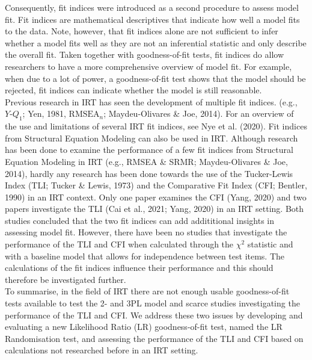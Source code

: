 \documentclass[Royal,sageapa,times,doublespace]{sagej}
\begin{document}
\indent Consequently, fit indices were introduced as a second procedure to assess model fit. Fit indices are mathematical descriptives that indicate how well a model fits to the data. Note, however, that fit indices alone are not sufficient to infer whether a model fits well as they are not an inferential statistic and only describe the overall fit. Taken together with goodness-of-fit tests, fit indices do allow researchers to have a more comprehensive overview of model fit. For example, when due to a lot of power, a goodness-of-fit test shows that the model should be rejected, fit indices can indicate whether the model is still reasonable. \\ 
\indent Previous research in IRT has seen the development of multiple fit indices. (e.g., $Y\text{-}Q_1$; Yen, 1981, $\text{RMSEA}_n$; Maydeu-Olivares \& Joe, 2014). For an overview of the use and limitations of several IRT fit indices, see Nye et al. (2020). Fit indices from Structural Equation Modeling can also be used in IRT. Although research has been done to examine the performance of a few fit indices from Structural Equation Modeling in IRT (e.g., RMSEA \& SRMR; Maydeu-Olivares \& Joe, 2014), hardly any research has been done towards the use of the Tucker-Lewis Index (TLI; Tucker \& Lewis, 1973) and the Comparative Fit Index (CFI; Bentler, 1990) in an IRT context. Only one paper examines the CFI (Yang, 2020) and two papers investigate the TLI (Cai et al., 2021; Yang, 2020) in an IRT setting. Both studies concluded that the two fit indices can add addititional insights in assessing model fit. However, there have been no studies that investigate the performance of the TLI and CFI when calculated through the $\chi^2$ statistic and with a baseline model that allows for independence between test items. The calculations of the fit indices influence their performance and this should therefore be investigated further. \\
\indent To summarise, in the field of IRT there are not enough usable goodness-of-fit tests available to test the 2- and 3PL model and scarce studies investigating the performance of the TLI and CFI. We address these two issues by developing and evaluating a new Likelihood Ratio (LR) goodness-of-fit test, named the LR Randomisation test, and assessing the performance of the TLI and CFI based on calculations not researched before in an IRT setting.  
\end{document}
